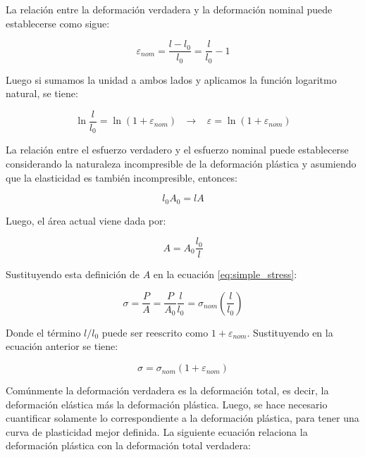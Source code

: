 La relación entre la deformación verdadera y la deformación nominal puede establecerse como sigue:

\begin{equation}
\varepsilon_{nom} = \frac{l - l_0}{l_0} = \frac{l}{l_0} - 1
\end{equation} 

Luego si sumamos la unidad a ambos lados y aplicamos la función logaritmo natural, se tiene:

\begin{equation}
\ln{\frac{l}{l_0}} = \ln(1 + \varepsilon_{nom}) \,\,\,\,  \rightarrow \,\,\,\,\, 
\varepsilon = \ln(1 + \varepsilon_{nom}) 
\end{equation}

La relación entre el esfuerzo verdadero y el esfuerzo nominal puede establecerse considerando 
la naturaleza incompresible de la deformación plástica y asumiendo que la elasticidad es 
también incompresible, entonces:

\begin{equation}
l_0 A_0 = l A
\end{equation}

Luego, el área actual viene dada por:

\begin{equation}
A = A_0 \frac{l_0}{l}
\end{equation}

Sustituyendo esta definición de $A$ en la ecuación \ref{eq:simple_stress}:

\begin{equation}
\sigma = \frac{P}{A} = \frac{P}{A_0} \frac{l}{l_0} = \sigma_{nom} \left( \frac{l}{l_0} \right)
\end{equation}

Donde el término $l/l_0$  puede ser reescrito como $1 + \varepsilon_{nom}$. Sustituyendo 
en la ecuación anterior se tiene:

\begin{equation} \label{eq:true_stress}
\sigma = \sigma_{nom} ( 1 + \varepsilon_{nom} )
\end{equation}

Comúnmente la deformación verdadera es la deformación total, es decir, la deformación elástica más 
la deformación plástica. Luego, se hace necesario cuantificar solamente lo correspondiente a la 
deformación plástica, para tener una curva de plasticidad mejor definida. La siguiente ecuación 
relaciona la deformación plástica con la deformación total verdadera: ~\cite{abaqus-gs-manual}

